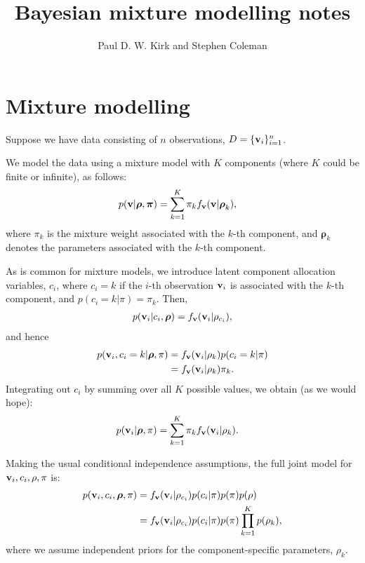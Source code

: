\documentclass[fleqn,11pt]{wlscirep}
\title{Bayesian mixture modelling notes}
\author[1,*]{Paul D. W. Kirk and Stephen Coleman}
\affil[1]{MRC Biostatistics Unit, Cambridge, UK}
\affil[*]{paul.kirk@mrc-bsu.cam.ac.uk}
\begin{document}
\maketitle
\vspace{-1.8cm}


\section{Mixture modelling}
Suppose we have data consisting of $n$ observations, $D = \{{\bf v}_i \}_{i = 1}^n$.

We model the data using a mixture model with $K$ components (where $K$ could be finite or infinite), as follows:
\begin{align}
p({\bf v}|\boldsymbol{\rho}, \boldsymbol{\pi}) & = \sum_{k=1}^K \pi_k f_{\bf v}({\bf v}|\boldsymbol{\rho}_k),
\end{align}
where $\pi_k$ is the mixture weight associated with the $k$-th component, and $\boldsymbol{\rho}_k$ denotes the parameters associated with the $k$-th component.  

As is common for mixture models, we introduce latent component allocation variables, $c_i$, where $c_i = k$ if the $i$-th observation ${\bf v}_i $ is associated with the $k$-th component, and $p(c_i = k| \pi) = \pi_k$.  Then, 
\begin{align}
p({\bf v}_i|c_i, \boldsymbol{\rho}) = f_{\bf v}({\bf v}_i | \rho_{c_i}),
\end{align}
and hence
\begin{align}
p({\bf v}_i,c_i = k| \boldsymbol{\rho}, \pi) &= f_{\bf v}({\bf v}_i | \rho_{k})p(c_i = k| \pi)\\
&=f_{\bf v}({\bf v}_i | \rho_{k})\pi_k.
\end{align}
Integrating out $c_i$ by summing over all $K$ possible values, we obtain (as we would hope):
\begin{align}
p({\bf v}_i| \boldsymbol{\rho}, \pi) &= \sum_{k = 1}^K \pi_k f_{\bf v}({\bf v}_i | \rho_{k}).
\end{align}

Making the usual conditional independence assumptions, the full joint model for ${\bf v}_i, c_i, \rho, \pi$ is:
\begin{align}
p({\bf v}_i,c_i, \boldsymbol{\rho}, \pi) &= f_{\bf v}({\bf v}_i | \rho_{c_i})p(c_i | \pi)p(\pi)p(\rho)\\
&= f_{\bf v}({\bf v}_i | \rho_{c_i})p(c_i | \pi)p(\pi)\prod_{k = 1}^K p(\rho_k),
\end{align}
where we assume independent priors for the component-specific parameters, $\rho_k$.
\end{document}
